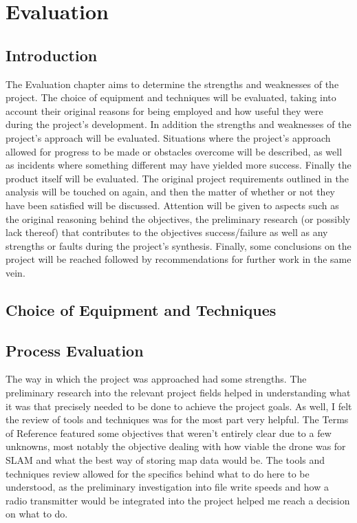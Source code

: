 \part{Evaluation}
	\chapter{Introduction}
	The Evaluation chapter aims to determine the strengths and weaknesses of the project. The choice of equipment and techniques will be evaluated, taking into account their original reasons for being employed and how useful they were during the project's development. In addition the strengths and weaknesses of the project's approach will be evaluated. Situations where the project's approach allowed for progress to be made or obstacles overcome will be described, as well as incidents where something different may have yielded more success. Finally the product itself will be evaluated. The original project requirements outlined in the analysis will be touched on again, and then the matter of whether or not they have been satisfied will be discussed. Attention will be given to aspects such as the original reasoning behind the objectives, the preliminary research (or possibly lack thereof) that contributes to the objectives success/failure as well as any strengths or faults during the project's synthesis. Finally, some conclusions on the project will be reached followed by recommendations for further work in the same vein. 
	
	\chapter{Choice of Equipment and Techniques}
	
	
	
	\chapter{Process Evaluation}
	
	The way in which the project was approached had some strengths. The preliminary research into the relevant project fields helped in understanding what it was that precisely needed to be done to achieve the project goals. As well, I felt the review of tools and techniques was for the most part very helpful. The Terms of Reference featured some objectives that weren't entirely clear due to a few unknowns, most notably the objective dealing with how viable the drone was for SLAM and what the best way of storing map data would be. The tools and techniques review allowed for the specifics behind what to do here to be understood, as the preliminary investigation into file write speeds and how a radio transmitter would be integrated into the project helped me reach a decision on what to do.
	
